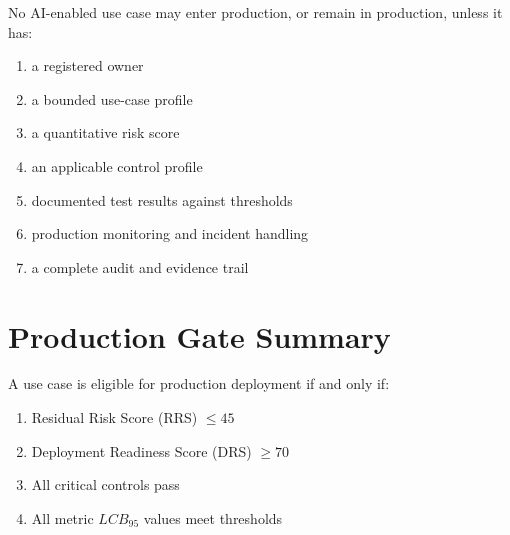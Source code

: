 \begin{tcolorbox}[colback=sgblue!5,colframe=sgblue!70,title=Universal Governance Policy]
No AI-enabled use case may enter production, or remain in production, unless it has:
\begin{enumerate}
  \item a registered owner
  \item a bounded use-case profile
  \item a quantitative risk score
  \item an applicable control profile
  \item documented test results against thresholds
  \item production monitoring and incident handling
  \item a complete audit and evidence trail
\end{enumerate}
\end{tcolorbox}

\section*{Production Gate Summary}

A use case is eligible for production deployment if and only if:

\begin{enumerate}
  \item Residual Risk Score (RRS) $\leq 45$
  \item Deployment Readiness Score (DRS) $\geq 70$
  \item All critical controls pass
  \item All metric $LCB_{95}$ values meet thresholds
\end{enumerate}

\tableofcontents